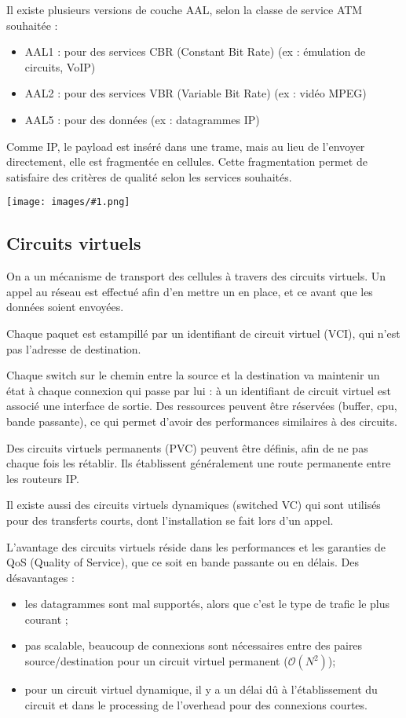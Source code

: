 \documentclass[10pt,a4paper]{report}
\newcommand{\dessin}[1]{\begin{center}\texttt{[image: images/\#1.png]}\end{center}}
\begin{document}
	
		Il existe plusieurs versions de couche AAL, selon la classe de service ATM souhaitée :
		
		\begin{itemize}
			\item AAL1 : pour des services CBR (Constant Bit Rate) (ex : émulation de circuits, VoIP)
			\item AAL2 : pour des services VBR (Variable Bit Rate) (ex : vidéo MPEG)
			\item AAL5 : pour des données (ex : datagrammes IP)
		\end{itemize}
		
	
	Comme IP, le payload est inséré dans une trame, mais au lieu de l'envoyer directement, elle est fragmentée en cellules. Cette fragmentation permet de satisfaire des critères de qualité selon les services souhaités.
	
	\dessin{8}
	
		\subsection{Circuits virtuels}
		
		On a un mécanisme de transport des cellules à travers des circuits virtuels. Un appel au réseau est effectué afin d'en mettre un en place, et ce avant que les données soient envoyées.
		
		Chaque paquet est estampillé par un identifiant de circuit virtuel (VCI), qui n'est pas l'adresse de destination.
		
		Chaque switch sur le chemin entre la source et la destination va maintenir un état à chaque connexion qui passe par lui : à un identifiant de circuit virtuel est associé une interface de sortie. Des ressources peuvent être réservées (buffer, cpu, bande passante), ce qui permet d'avoir des performances similaires à des circuits.
	
	Des circuits virtuels permanents (PVC) peuvent être définis, afin de ne pas chaque fois les rétablir. Ils établissent généralement une route permanente entre les routeurs IP.	
	
	Il existe aussi des circuits virtuels dynamiques (switched VC) qui sont utilisés pour des transferts courts, dont l'installation se fait lors d'un appel.
	
	L'avantage des circuits virtuels réside dans les performances et les garanties de QoS (Quality of Service), que ce soit en bande passante ou en délais.
	Des désavantages :
	
	\begin{itemize}
		\item les datagrammes sont mal supportés, alors que c'est le type de trafic le plus courant ;
		\item pas scalable, beaucoup de connexions sont nécessaires entre des paires source/destination pour un circuit virtuel permanent ($\mathcal{O}(N^2)$);
		\item pour un circuit virtuel dynamique, il y a un délai dû à l'établissement du circuit et dans le processing de l'overhead pour des connexions courtes.
	\end{itemize}
	
\end{document}
